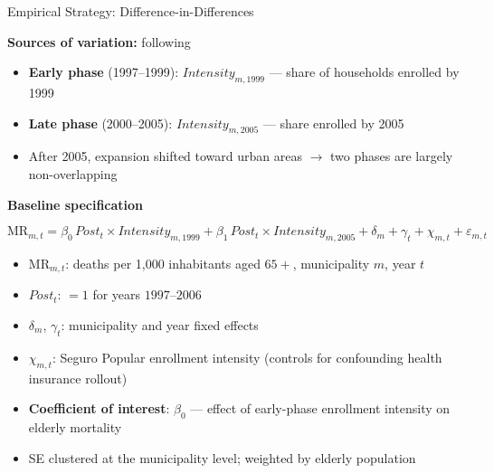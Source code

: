 \documentclass[aspectratio=169,usenames,dvipsnames]{beamer}
\newcommand{\smallcite}[1]{{\footnotesize\textcolor{Blue}{\citep{#1}}}}
\begin{document}
\begin{frame}{Empirical Strategy: Difference-in-Differences}\label{empirics}
\small

\textbf{Sources of variation:} following \smallcite{parker2023conditional}

\begin{itemize}
  \item \textbf{Early phase} (1997--1999): $\textit{Intensity}_{m,1999}$ --- share of households enrolled by 1999
  \item \textbf{Late phase} (2000--2005): $\textit{Intensity}_{m,2005}$ --- share enrolled by 2005
  \item After 2005, expansion shifted toward urban areas $\to$ two phases are largely non-overlapping
\end{itemize}

\vspace{6pt}

\textbf{Baseline specification}

\vspace{-2pt}

\begin{equation*}
\text{MR}_{m,t}
= \beta_{0}\,\textit{Post}_{t} \times \textit{Intensity}_{m,1999}
+ \beta_{1}\,\textit{Post}_{t} \times \textit{Intensity}_{m,2005}
+ \delta_{m} + \gamma_{t} + \chi_{m,t} + \varepsilon_{m,t}
\end{equation*}

\vspace{4pt}

\begin{itemize}
  \item $\text{MR}_{m,t}$: deaths per 1,000 inhabitants aged $65+$, municipality $m$, year $t$
  \item $\textit{Post}_{t}$: $= 1$ for years $1997$--$2006$
  \item $\delta_m$, $\gamma_t$: municipality and year fixed effects
  \item $\chi_{m,t}$: Seguro Popular enrollment intensity (controls for confounding health insurance rollout)
  \item \textbf{Coefficient of interest}: $\beta_0$ --- effect of early-phase enrollment intensity on elderly mortality
  \item SE clustered at the municipality level; weighted by elderly population
\end{itemize}

\end{frame}
\end{document}
